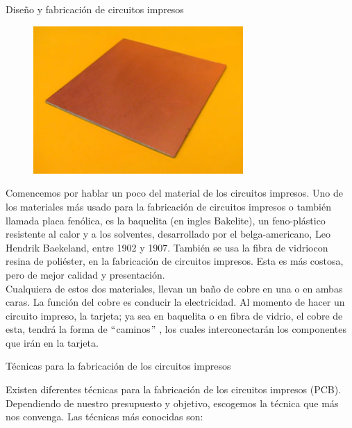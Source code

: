 \documentclass[12pt]{article}
\begin{document}
Diseño y fabricación de circuitos impresos\par




\begin{figure}[H]
	\begin{Center}
		\includegraphics[width=3.15in,height=2.21in]{./media/image5.jpeg}
	\end{Center}
\end{figure}



\par

Comencemos por hablar un poco del material de los circuitos impresos. Uno de los materiales más usado para la fabricación de circuitos impresos o también llamada placa fenólica, es la baquelita (en ingles Bakelite), un feno-plástico resistente al calor y a los solventes, desarrollado por el belga-americano, Leo Hendrik Baekeland, entre 1902 y 1907. También se usa la fibra de vidriocon resina de poliéster, en la fabricación de circuitos impresos. Esta es más costosa, pero de mejor calidad y presentación.\\
Cualquiera de estos dos materiales, llevan un baño de cobre en una o en ambas caras. La función del cobre es conducir la electricidad. Al momento de hacer un circuito impreso, la tarjeta; ya sea en baquelita o en fibra de vidrio, el cobre de esta, tendrá la forma de $``$caminos$"$ , los cuales interconectarán los componentes que irán en la tarjeta.\par

Técnicas para la fabricación de los circuitos impresos\par

Existen diferentes técnicas para la fabricación de los circuitos impresos (PCB). Dependiendo de nuestro presupuesto y objetivo, escogemos la técnica que más nos convenga. Las técnicas más conocidas son:\par
\end{document}
